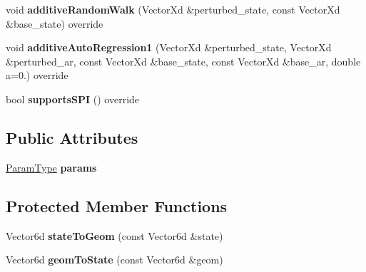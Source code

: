 \begin{DoxyCompactItemize}
\item 
\hypertarget{classAffine_afabebe898c9bf0cab5caab714c6f3b79}{void {\bfseries additive\-Random\-Walk} (Vector\-Xd \&perturbed\-\_\-state, const Vector\-Xd \&base\-\_\-state) override}\label{classAffine_afabebe898c9bf0cab5caab714c6f3b79}

\item 
\hypertarget{classAffine_aab7fa4e999bae0e888c106dafe8db3d9}{void {\bfseries additive\-Auto\-Regression1} (Vector\-Xd \&perturbed\-\_\-state, Vector\-Xd \&perturbed\-\_\-ar, const Vector\-Xd \&base\-\_\-state, const Vector\-Xd \&base\-\_\-ar, double a=0.) override}\label{classAffine_aab7fa4e999bae0e888c106dafe8db3d9}

\item 
\hypertarget{classAffine_a380a38a137d2fe0b80f7ede3b19048e8}{bool {\bfseries supports\-S\-P\-I} () override}\label{classAffine_a380a38a137d2fe0b80f7ede3b19048e8}

\end{DoxyCompactItemize}
\subsection*{Public Attributes}
\begin{DoxyCompactItemize}
\item 
\hypertarget{classAffine_a41caf13a6b620c5e22dcba8deb63650b}{\hyperlink{structAffineParams}{Param\-Type} {\bfseries params}}\label{classAffine_a41caf13a6b620c5e22dcba8deb63650b}

\end{DoxyCompactItemize}
\subsection*{Protected Member Functions}
\begin{DoxyCompactItemize}
\item 
\hypertarget{classAffine_a95f484115ee487b6e53e829a4e5c2842}{Vector6d {\bfseries state\-To\-Geom} (const Vector6d \&state)}\label{classAffine_a95f484115ee487b6e53e829a4e5c2842}

\item 
\hypertarget{classAffine_a4cbcce9fc44fcfbe7d3d8bae35c64e00}{Vector6d {\bfseries geom\-To\-State} (const Vector6d \&geom)}\label{classAffine_a4cbcce9fc44fcfbe7d3d8bae35c64e00}

\end{DoxyCompactItemize}
